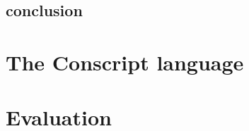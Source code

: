 \subsection{conclusion}

\section{The Conscript language}
\label{sec:ValidationConscript}

\section{Evaluation}
\label{sec:ValidationEvaluation}
